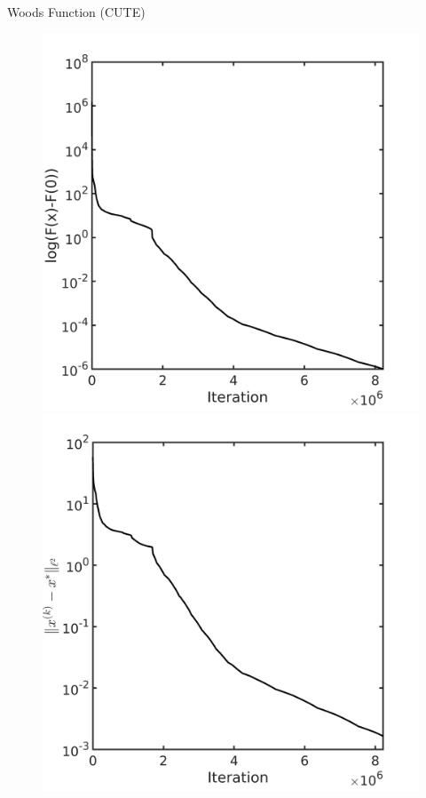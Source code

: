 \documentclass{beamer}
\begin{document}
\begin{frame}{Woods Function (CUTE)}
\begin{figure}[!htbp]
	  \includegraphics[scale=0.21]{./figures/woods320D.png}
	  \includegraphics[scale=0.21]{./figures/woods320D_dist.png}
\end{figure}
\end{frame}
\end{document}
